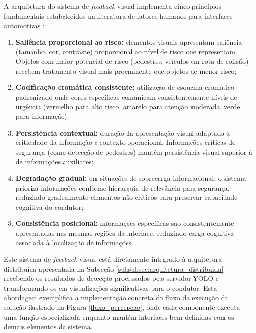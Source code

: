 A arquitetura do sistema de \textit{feedback} visual implementa cinco princípios fundamentais estabelecidos na literatura de fatores humanos para interfaces automotivas \cite{endsley2016designing}:

\begin{enumerate}
    \item \textbf{Saliência proporcional ao risco:} elementos visuais apresentam saliência (tamanho, cor, contraste) proporcional ao nível de risco que representam. Objetos com maior potencial de risco (pedestres, veículos em rota de colisão) recebem tratamento visual mais proeminente que objetos de menor risco;
    
    \item \textbf{Codificação cromática consistente:} utilização de esquema cromático padronizado onde cores específicas comunicam consistentemente níveis de urgência (vermelho para alto risco, amarelo para atenção moderada, verde para informação);
    
    \item \textbf{Persistência contextual:} duração da apresentação visual adaptada à criticidade da informação e contexto operacional. Informações críticas de segurança (como detecção de pedestres) mantêm persistência visual superior à de informações auxiliares;
    
    \item \textbf{Degradação gradual:} em situações de sobrecarga informacional, o sistema prioriza informações conforme hierarquia de relevância para segurança, reduzindo gradualmente elementos não-críticos para preservar capacidade cognitiva do condutor;
    
    \item \textbf{Consistência posicional:} informações específicas são consistentemente apresentadas nas mesmas regiões da interface, reduzindo carga cognitiva associada à localização de informações.
\end{enumerate}

Este sistema de \textit{feedback} visual está diretamente integrado à arquitetura distribuída apresentada na Subseção \ref{subsubsec:arquitetura_distribuida}, recebendo os resultados de detecção processados pelo servidor YOLO e transformando-os em visualizações significativas para o condutor. Esta abordagem exemplifica a implementação concreta do fluxo da execução da solução ilustrado na Figura \ref{fluxo_percepcao}, onde cada componente executa uma função especializada enquanto mantém interfaces bem definidas com os demais elementos do sistema.

